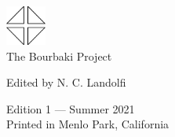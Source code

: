 %





\usepackage{tocloft}
\setlength{\cftsecnumwidth}{3em}



\begin{center}
  \includegraphics[width=0.1\textwidth]{../trademark}
  \\
  \vspace{0.5cm}
  \textsf{\Large The Bourbaki Project}

{\small \textsf{Edited by N. C. Landolfi}}
\end{center}

\vspace{\fill}



\begin{center}
  {\small \textsf{Edition 1 --- Summer 2021}} \\

  {\footnotesize \textsf{Printed in Menlo Park, California}}
\end{center}

\thispagestyle{empty}

\clearpage


\clearpage




